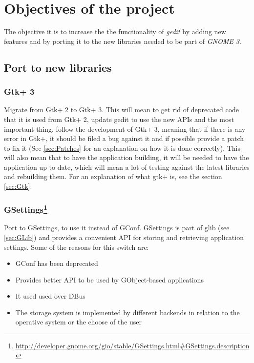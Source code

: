 
\chapter{Objectives of the project}


The objective it is to increase the the functionality of \emph{gedit} by adding new features and by porting it to the new libraries needed to be part of \emph{GNOME 3}.

\section{Port to new libraries}\label{sec:NewLibraries}

\subsection{Gtk+ 3}\label{sec:Gtk3}

Migrate from Gtk+ 2 to Gtk+ 3. This will mean to get rid of deprecated code that it is used from Gtk+ 2, update gedit to use the new APIs and the most important thing, follow the development of Gtk+ 3, meaning that if there is any error in Gtk+, it should be filed a bug against it and if possible provide a patch to fix it (See \ref{sec:Patches} for an explanation on how it is done correctly). This will also mean that to have the application building, it will be needed to have the application up to date, which will mean a lot of testing against the latest libraries and rebuilding them. For an explanation of what gtk+ is, see the section \ref{sec:Gtk}.

\subsection[GSettings]{GSettings\footnote{\url{http://developer.gnome.org/gio/stable/GSettings.html\#GSettings.description}}}\label{sec:GSettings}

Port to GSettings, to use it instead of GConf. GSettings is part of glib (see \ref{sec:GLib}) and provides a convenient API for storing and retrieving application settings. Some of the reasons for this switch are:
\begin{itemize}
  \item GConf has been deprecated
  \item Provides better API to be used by GObject-based applications
  \item It used used over DBus
  \item The storage system is implemented by different backends in relation to the operative system or the choose of the user
\end{itemize}

